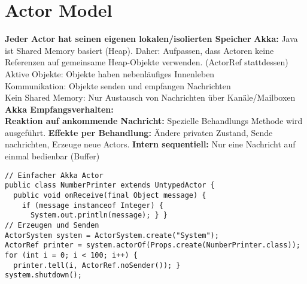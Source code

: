 
\section{Actor Model}
\textbf{Jeder Actor hat seinen eigenen lokalen/isolierten Speicher}
\textcolor{b}{\textbf{Akka:} Java ist Shared Memory basiert (Heap). Daher: Aufpassen, dass Actoren keine Referenzen auf gemeinsame Heap-Objekte verwenden. (ActorRef stattdessen)}\\
\textcolor{b}{Aktive Objekte:} Objekte haben nebenläufiges Innenleben\\
\textcolor{b}{Kommunikation:} Objekte senden und empfangen Nachrichten\\
\textcolor{b}{Kein Shared Memory:} Nur Austausch von Nachrichten über Kanäle/Mailboxen\\
\textcolor{b}{\textbf{Akka Empfangsverhalten:}}\\
\textbf{Reaktion auf ankommende Nachricht:} Spezielle Behandlungs Methode wird ausgeführt. \textbf{Effekte per Behandlung:} Ändere privaten Zustand, Sende nachrichten, Erzeuge neue Actors. \textbf{Intern sequentiell:} Nur eine Nachricht auf einmal bedienbar (Buffer)
\begin{lstlisting}
// Einfacher Akka Actor
public class NumberPrinter extends UntypedActor {
  public void onReceive(final Object message) {
    if (message instanceof Integer) {
      System.out.println(message); } }
// Erzeugen und Senden
ActorSystem system = ActorSystem.create("System");
ActorRef printer = system.actorOf(Props.create(NumberPrinter.class));
for (int i = 0; i < 100; i++) {
  printer.tell(i, ActorRef.noSender()); }
system.shutdown();
\end{lstlisting}
